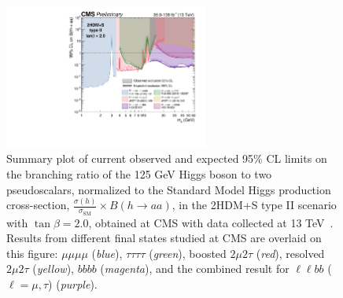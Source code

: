   \begin{figure}[h]
    \begin{center}
      \includegraphics[width=0.6\textwidth]{figures/ch-10-results/summary_plot_full_run2_plot_BRaa_Type2_tanbeta2.pdf}
    \end{center}
    \caption[Summary plot of current observed and expected 95\% CL limits on the branching ratio of the 125 GeV Higgs boson to two pseudoscalars, normalized to the Standard Model Higgs production cross-section, $\frac{\sigma(h)}{\sigma_{\text{SM}}} \times B(h \rightarrow aa)$, in the 2HDM+S type II scenario with $\tan\beta = 2.0$, obtained at CMS with data collected at 13 TeV.]{Summary plot of current observed and expected 95\% CL limits on the branching ratio of the 125 GeV Higgs boson to two pseudoscalars, normalized to the Standard Model Higgs production cross-section, $\frac{\sigma(h)}{\sigma_{\text{SM}}} \times B(h \rightarrow aa)$, in the 2HDM+S type II scenario with $\tan\beta = 2.0$, obtained at CMS with data collected at 13 TeV~\cite{twiki_2HDM+S_summary-plots}. Results from different final states studied at CMS are overlaid on this figure: $\mu\mu\mu\mu$ (\textit{blue}), $\tau\tau\tau\tau$ (\textit{green}), boosted $2\mu 2\tau$ (\textit{red}), resolved $2\mu 2\tau$ (\textit{yellow}), $bbbb$ (\textit{magenta}), and the combined result for $\ell\ell bb$ ($\ell = \mu, \tau$) (\textit{purple}).}
      \label{fig:summary_plot_typeII_tan_beta_2p0}
  \end{figure}
